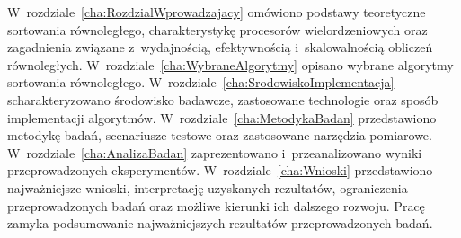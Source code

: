 W~rozdziale~\ref{cha:RozdzialWprowadzajacy} omówiono podstawy teoretyczne sortowania równoległego, 
charakterystykę procesorów wielordzeniowych oraz zagadnienia związane z~wydajnością, efektywnością i~skalowalnością obliczeń równoległych.
W~rozdziale~\ref{cha:WybraneAlgorytmy} opisano wybrane algorytmy sortowania równoległego. 
W~rozdziale~\ref{cha:SrodowiskoImplementacja} scharakteryzowano środowisko badawcze, zastosowane technologie oraz sposób implementacji algorytmów. 
W~rozdziale~\ref{cha:MetodykaBadan} przedstawiono metodykę badań, scenariusze testowe oraz zastosowane narzędzia pomiarowe.
W~rozdziale~\ref{cha:AnalizaBadan} zaprezentowano i~przeanalizowano wyniki przeprowadzonych eksperymentów.
W~rozdziale~\ref{cha:Wnioski} przedstawiono najważniejsze wnioski, interpretację uzyskanych rezultatów, 
ograniczenia przeprowadzonych badań oraz możliwe kierunki ich dalszego rozwoju.
Pracę zamyka podsumowanie najważniejszych rezultatów przeprowadzonych badań.